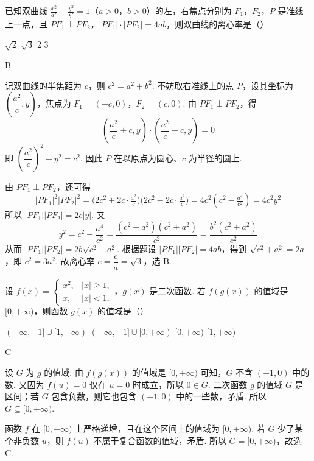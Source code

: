 \begin{problem}
已知双曲线 \(\frac{x^2}{a^2} - \frac{y^2}{b^2} = 1\)（\(a > 0\)，\(b > 0\)）的左，右焦点分别为 \(F_1\)，\(F_2\)，\(P\) 是准线上一点，且 \(PF_1 \perp PF_2\)，\(|PF_1| \cdot |PF_2| = 4ab\)，则双曲线的离心率是（\quad）

\choices
    {\(\sqrt{2}\)}
    {\(\sqrt{3}\)}
    {\(2\)}
    {\(3\)}
\begin{answer}
B
\end{answer}

\begin{solution}
记双曲线的半焦距为 \(c\)，则 \(c^2=a^2+b^2\). 不妨取右准线上的点 \(P\)，设其坐标为 \(\left(\dfrac{a^2}{c},y\right)\)，焦点为 \(F_1=(-c,0)\)，\(F_2=(c,0)\). 由 \(PF_1\perp PF_2\)，得
\[
\left(\dfrac{a^2}{c}+c,y\right)\cdot\left(\dfrac{a^2}{c}-c,y\right)=0
\]
即 \(\left(\dfrac{a^2}{c}\right)^2+y^2=c^2\). 因此 \(P\) 在以原点为圆心、\(c\) 为半径的圆上.

由 \(PF_1\perp PF_2\)，还可得
\[
\lvert PF_1\rvert^2\lvert PF_2\rvert^2
=\bigl(2c^2+2c\cdot\tfrac{a^2}{c}\bigr)\bigl(2c^2-2c\cdot\tfrac{a^2}{c}\bigr)
=4c^2\left(c^2-\tfrac{a^4}{c^2}\right)=4c^2y^2
\]
所以 \(\lvert PF_1\rvert\lvert PF_2\rvert=2c\lvert y\rvert\). 又
\[
y^2=c^2-\frac{a^4}{c^2}=\frac{(c^2-a^2)(c^2+a^2)}{c^2}=\frac{b^2(c^2+a^2)}{c^2}
\]
从而 \(\lvert PF_1\rvert\lvert PF_2\rvert=2b\sqrt{c^2+a^2}\). 根据题设 \(\lvert PF_1\rvert\lvert PF_2\rvert=4ab\)，得到 \(\sqrt{c^2+a^2}=2a\)，即 \(c^2=3a^2\). 故离心率 \(e=\dfrac ca=\sqrt3\)，选 B.
\end{solution}
\end{problem}

\begin{problem}
设 \( f(x) = \begin{cases}
x^2, & |x| \geqslant 1,\\
x, & |x| < 1,
\end{cases} \)，\(g(x)\) 是二次函数. 若 \( f(g(x)) \) 的值域是 \([0, +\infty)\)，则函数 \( g(x) \) 的值域是（\quad）

\choices
    {\((-\infty, -1] \cup [1, +\infty)\)}
    {\((-\infty, -1] \cup [0, +\infty)\)}
    {\([0, +\infty)\)}
    {\([1, +\infty)\)}
\end{problem}

\begin{answer}
C
\end{answer}

\begin{solution}
设 \(G\) 为 \(g\) 的值域. 由 \(f(g(x))\) 的值域是 \([0,+\infty)\) 可知，\(G\) 不含 \((-1,0)\) 中的数. 又因为 \(f(u)=0\) 仅在 \(u=0\) 时成立，所以 \(0\in G\). 二次函数 \(g\) 的值域 \(G\) 是区间；若 \(G\) 包含负数，则它也包含 \((-1,0)\) 中的一些数，矛盾. 所以 \(G\subseteq[0,+\infty)\).

函数 \(f\) 在 \([0,+\infty)\) 上严格递增，且在这个区间上的值域为 \([0,+\infty)\). 若 \(G\) 少了某个非负数 \(u\)，则 \(f(u)\) 不属于复合函数的值域，矛盾. 所以 \(G=[0,+\infty)\)，故选 C.
\end{solution}

